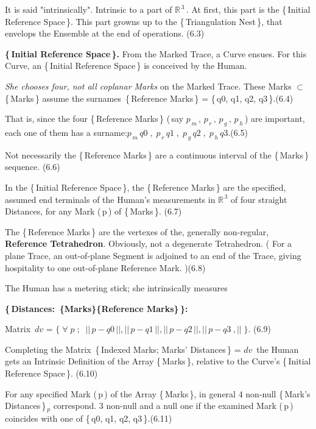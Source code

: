 \documentclass[12pt]{article} %
\begin{document}
{\noindent It is said "intrinsically". Intrinsic to a part of $\mathbb{R}^{\,3}$\,. At first, this part is the \{\,Initial Reference Space\,\}. This part growns up to the \{\,Triangulation Nest\,\}, that envelops the Ensemble at the end of operations. \qquad \qquad \qquad (6.3)

\noindent \textbf{\{\,Initial Reference Space\,\}.} From the Marked Trace, a Curve ensues. For this Curve, an \{\,Initial Reference Space\,\} is conceived by the Human.

\noindent \textsl{She chooses four, not all coplanar Marks} on the Marked Trace. These Marks $\subset$ \{\,Marks\,\} assume the surnames\, \{\,Reference Marks\,\} = \{\,q0, q1, q2, q3\,\}.\quad (6.4)

\noindent That is, since the four \{\,Reference Marks\,\} (\,say $p_{\,m}\,,\,p_{\,r}\,,\,p_{\,g}\,,\,p_{\,h}$\,) are important, each one of them has a surname:\quad $p_{\,m}\,q0\;,\;p_{\,r}\,q1\;,\;p_{\,g}\,q2\;,\;p_{\,h}\,q3$\;.\qquad \qquad (6.5)  

\noindent Not necessarily the \{\,Reference Marks\,\} are a continuous interval of the \{\,Marks\,\} sequence. \qquad \qquad \qquad \qquad \qquad (6.6)

\noindent In the \{\,Initial Reference Space\,\}, the \{\,Reference Marks\,\} are the specified, assumed end terminals of the Human's measurements in $\mathbb{R}^{\,3}$ of four straight Distances, for any Mark (\,p\,) of \{\,Marks\,\}.  (6.7)

\noindent The \{\,Reference Marks\,\} are the vertexes of the, generally non-regular, \textbf{Reference Tetrahedron}. Obviously, not a degenerate Tetrahedron. ( For a plane Trace, an out-of-plane Segment is adjoined to an end of the Trace, giving hospitality to one out-of-plane Reference Mark. )\qquad(6.8)

\noindent The Human has a metering stick; she intrinsically measures 

\noindent \textbf{\big\{\,Distances:\, \{Marks\}<-->\{Reference Marks\}\,\big\}:}

\noindent Matrix $\,dv$ = $\big\{\;\forall\;p\;;\;\; ||\,p - q0\,||, ||\,p - q1\,||, ||\,p - q2\,||, ||\,p - q3\
,||\;\big\}$. \qquad (6.9)

\noindent Completing the Matrix\, \{\,Indexed Marks; Marks' Distances\,\} = $dv$ \,the Human gets an Intrinsic Definition of the Array \{\,Marks\,\}, relative to the Curve's \{\,Initial Reference Space\,\}. \qquad (6.10) 

\noindent For any specified Mark (\,p\,) of the Array \{\,Marks\,\}, in general 4 non-null \{\,Mark's Distances\,\}$_{\,p}$ correspond. 3 non-null and a null one if the examined Mark (\,p\,) coincides with one of \{\,q0, q1, q2, q3\,\}.\qquad \qquad (6.11)

}
\end{document}

